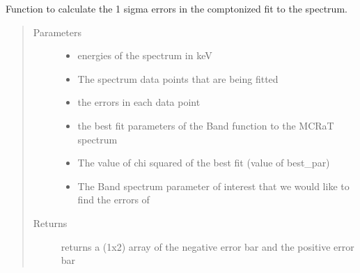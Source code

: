 \documentclass[letterpaper,10pt,english]{sphinxmanual}
\begin{document}
\begin{fulllineitems}
\label{\detokenize{read_process_files:read_process_files.param_err}}
Function to calculate the 1 sigma errors in the comptonized fit to the spectrum.
\begin{quote}\begin{description}
\item[{Parameters}] \leavevmode\begin{itemize}
\item {} 
 \textendash{} energies of the spectrum in keV

\item {} 
 \textendash{} The spectrum data points that are being fitted

\item {} 
 \textendash{} the errors in each data point

\item {} 
 \textendash{} the best fit parameters of the Band function to the MCRaT spectrum

\item {} 
 \textendash{} The value of chi squared of the best fit (value of best\_par)

\item {} 
 \textendash{} The Band spectrum parameter of interest that we would like to find the errors of

\end{itemize}

\item[{Returns}] \leavevmode
returns a (1x2) array of the negative error bar and the positive error bar

\end{description}\end{quote}

\end{fulllineitems}

\end{document}
